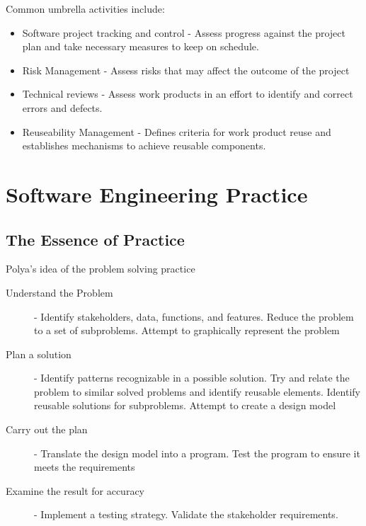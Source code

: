 \documentclass[12pt letter]{report}
\begin{document}

Common umbrella activities include:
\begin{itemize}
  \item Software project tracking and control - Assess progress against the project plan and take necessary measures to keep on schedule.
  \item Risk Management - Assess risks that may affect the outcome of the project
  \item Technical reviews - Assess work products in an effort to identify and correct errors and defects.
  \item Reuseability Management - Defines criteria for work product reuse and establishes mechanisms to achieve reusable components.
\end{itemize}

\section{Software Engineering Practice}
\subsection{The Essence of Practice}
Polya's idea of the problem solving practice
\begin{description}
  \item[Understand the Problem] - Identify stakeholders, data, functions, and features. Reduce the problem to a set of subproblems. Attempt to graphically represent the problem
  \item[Plan a solution] - Identify patterns recognizable in a possible solution. Try and relate the problem to similar solved problems and identify reusable elements. Identify reusable solutions for subproblems. Attempt to create a design model
  \item[Carry out the plan] - Translate the design model into a program. Test the program to ensure it meets the requirements
  \item[Examine the result for accuracy] - Implement a testing strategy. Validate the stakeholder requirements.
\end{description}
\end{document}
